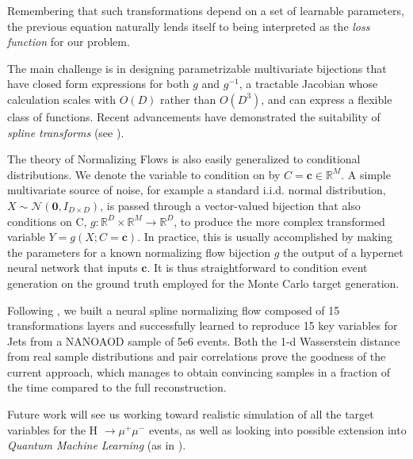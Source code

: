 \documentclass{scrartcl} %
\begin{document}
Remembering that such transformations depend on a set of learnable parameters, the previous equation naturally lends itself to being interpreted as the \emph{loss function} for our problem.

The main challenge is in designing parametrizable multivariate bijections that have closed form expressions for both $g$ and $g^{-1}$, a tractable Jacobian whose calculation scales with $O(D)$ rather than $O(D^3)$, and can express a flexible class of functions. Recent advancements have demonstrated the suitability of \emph{spline transforms} (see \cite{durkan}).

The theory of Normalizing Flows is also easily generalized to conditional distributions. We denote the variable to condition on by $C=\mathbf{c}\in\mathbb{R}^M$. A simple multivariate source of noise, for example a standard i.i.d. normal distribution, $X\sim\mathcal{N}(\mathbf{0},I_{D\times D})$, is passed through a vector-valued bijection that also conditions on C, $g:\mathbb{R}^D\times\mathbb{R}^M\rightarrow\mathbb{R}^D$, to produce the more complex transformed variable $Y=g(X;C=\mathbf{c})$. In practice, this is usually accomplished by making the parameters for a known normalizing flow bijection $g$ the output of a hypernet neural network that inputs $\mathbf{c}$. It is thus straightforward to condition event generation on the ground truth employed for the Monte Carlo target generation.

Following \cite{green2020complete}, we built a  neural spline normalizing flow composed of 15 transformations layers and successfully learned to reproduce 15 key variables for Jets from a NANOAOD sample of 5e6 events. Both the 1-d Wasserstein distance from real sample distributions and pair correlations prove the goodness of the current approach, which manages to obtain convincing samples in a fraction of the time compared to the full reconstruction.

Future work will see us working toward realistic simulation of all the target variables for the  H $\xrightarrow{} \mu^+ \mu^-$ events, as well as looking into possible extension into \emph{Quantum Machine Learning} (as in \cite{chang2021quantum}).

	
	
\end{document}
